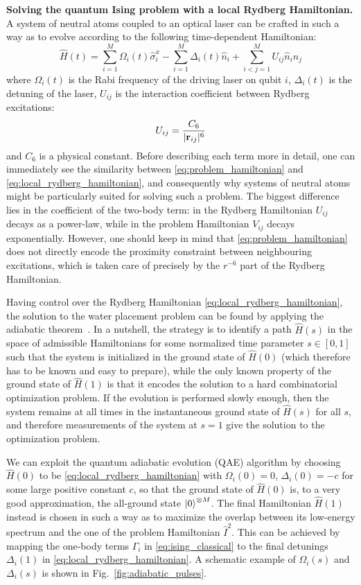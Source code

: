 \documentclass[fleqn,10pt]{wlscirep}
\begin{document}
\textbf{Solving the quantum Ising problem with a local Rydberg Hamiltonian.} A system of neutral atoms coupled to an optical laser can be crafted in such a way as to evolve according to the following time-dependent Hamiltonian:  
\begin{equation}\label{eq:local_rydberg_hamiltonian}
    \hat{H}(t) = \sum_{i=1}^M \Omega_i(t)\hat{\sigma}^x_i - \sum_{i=1}^M \Delta_i(t) \hat{n}_i +\sum_{i<j=1}^{M} U_{ij} \hat{n}_i \hat{n}_j
\end{equation}
where $\Omega_i(t)$ is the Rabi frequency of the driving laser on qubit $i$, $\Delta_i(t)$ is the detuning of the laser, $U_{ij}$ is the interaction coefficient between Rydberg excitations:
\begin{equation}
    U_{ij} = \frac{C_6}{|\vb{r}_{ij}|^6}
\end{equation}
and $C_6$ is a physical constant. Before describing each term more in detail, one can immediately see the similarity between \eqref{eq:problem_hamiltonian} and \eqref{eq:local_rydberg_hamiltonian}, and consequently why systems of neutral atoms might be particularly suited for solving such a problem. The biggest difference lies in the coefficient of the two-body term: in the Rydberg Hamiltonian $U_{ij}$ decays as a power-law, while in the problem Hamiltonian $V_{ij}$ decays exponentially. However, one should keep in mind that \eqref{eq:problem_hamiltonian} does not directly encode the proximity constraint between neighbouring excitations, which is taken care of precisely by the $r^{-6}$ part of the Rydberg Hamiltonian.

Having control over the Rydberg Hamiltonian \eqref{eq:local_rydberg_hamiltonian}, the solution to the water placement problem can be found by applying the adiabatic theorem~\cite{Farhi2001}. In a nutshell, the strategy is to identify a path $\hat{H}(s)$ in the space of admissible Hamiltonians for some normalized time parameter $s \in [0,1]$ such that the system is initialized in the ground state of $\hat{H}(0)$ (which therefore has to be known and easy to prepare), while the only known property of the ground state of $\hat{H}(1)$ is that it encodes the solution to a hard combinatorial optimization problem. If the evolution is performed slowly enough, then the system remains at all times in the instantaneous ground state of $\hat{H}(s)$ for all $s$, and therefore measurements of the system at $s=1$ give the solution to the optimization problem. 

We can exploit the quantum adiabatic evolution (QAE) algorithm by choosing $\hat{H}(0)$ to be \eqref{eq:local_rydberg_hamiltonian} with $\Omega_i(0) = 0$, $\Delta_i(0) = -c$ for some large positive constant $c$, so that the ground state of $\hat{H}(0)$ is, to a very good approximation, the all-ground state $\ket{0}^{\otimes M}$. The final Hamiltonian $\hat{H}(1)$ instead is chosen in such a way as to maximize the overlap between its low-energy spectrum and the one of the problem Hamiltonian $\hat{I}^2$. This can be achieved by mapping the one-body terms $\Gamma_i$ in \eqref{eq:ising_classical} to the final detunings $\Delta_i(1)$ in \eqref{eq:local_rydberg_hamiltonian}. A schematic example of $\Omega_i(s)$ and $\Delta_i(s)$ is shown in Fig.~\ref{fig:adiabatic_pulses}.
\end{document}
